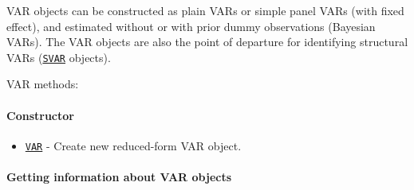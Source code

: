 

	VAR objects can be constructed as plain VARs or simple panel VARs (with
fixed effect), and estimated without or with prior dummy observations
(Bayesian VARs). The VAR objects are also the point of departure for
identifying structural VARs (\href{SVAR/Contents}{\texttt{SVAR}}
objects).

VAR methods:

\paragraph{Constructor}\label{constructor}

\begin{itemize}
\itemsep1pt\parskip0pt
\item
  \href{VAR/VAR}{\texttt{VAR}} - Create new reduced-form VAR object.
\end{itemize}

\paragraph{Getting information about VAR
objects}\label{getting-information-about-var-objects}

